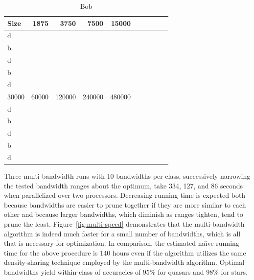 \documentclass[twoside,leqno,twocolumn]{article}
\begin{document}
\begin{table}[b]
  \begin{center}\begin{tabular}{|l|r|r|r|r|r|r|r|r|r|}
    \hline
    \hline
    Size & 1875 & 3750 & 7500 & 15000 \\
    \hline
    \hline
    d \\
    \hline
    b \\
    \hline
    d \\
    \hline
    b \\
    \hline
    d \\
    \hline
    \hline
    30000 & 60000 & 120000 & 240000 & 480000 \\
    \hline
    \hline
    d \\
    \hline
    b \\
    \hline
    d \\
    \hline
    b \\
    \hline
    d \\
    \hline
    \hline
  \end{tabular}\end{center}\vspace{}
  \caption{Bob}
\end{table}
\fi

Three multi-bandwidth runs with 10 bandwidths per class, successively
narrowing the tested bandwidth ranges about the optimum, take 334,
127, and 86 seconds when parallelized over two processors.  Decreasing
running time is expected both because bandwidths are easier to prune
together if they are more similar to each other and because larger
bandwidths, which diminish as ranges tighten, tend to prune the least.
Figure~\ref{fig:multi-speed} demonstrates that the multi-bandwidth
algorithm is indeed much faster for a small number of bandwidths,
which is all that is necessary for optimization.  In comparison, the
estimated na\"{\i}ve running time for the above procedure is 140 hours
even if the algorithm utilizes the same density-sharing technique
employed by the multi-bandwidth algorithm.  Optimal bandwidths yield
within-class of accuracies of 95\% for quasars and 98\% for stars.
\end{document}
